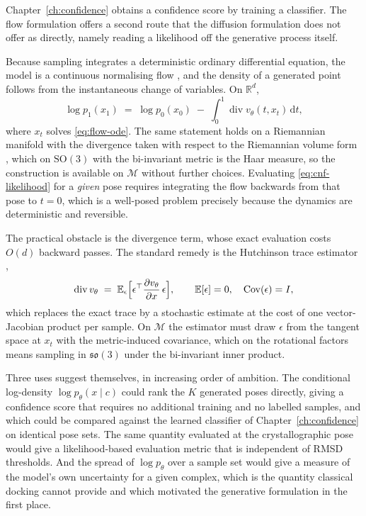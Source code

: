 \documentclass[11pt,a4paper]{report}
\theoremstyle{plain}
\theoremstyle{definition}
\theoremstyle{remark}
\newcommand{\R}{\mathbb{R}}
\newcommand{\SOthree}{\mathrm{SO}(3)}
\newcommand{\sothree}{\mathfrak{so}(3)}
\newcommand{\Mfd}{\mathcal{M}}
\newcommand{\E}{\mathbb{E}}
\newcommand{\dif}{\mathrm{d}}
\newcommand{\pred}{v_\theta}
\newcommand{\ctx}{c}
\newcommand{\divg}{\operatorname{div}}
\begin{document}
Chapter~\ref{ch:confidence} obtains a confidence score by training a
classifier. The flow formulation offers a second route that the diffusion
formulation does not offer as directly, namely reading a likelihood off the
generative process itself.

Because sampling integrates a deterministic ordinary differential equation, the
model is a continuous normalising flow \citep{chen2018neural}, and the density
of a generated point follows from the instantaneous change of variables. On
$\R^{d}$,
\begin{equation}
  \log p_1(x_1) \;=\; \log p_0(x_0)
    \;-\; \int_0^1 \divg \pred(t, x_t)\, \dif t ,
  \label{eq:cnf-likelihood}
\end{equation}
where $x_t$ solves \eqref{eq:flow-ode}. The same statement holds on a
Riemannian manifold with the divergence taken with respect to the Riemannian
volume form \citep{chen2024riemannian}, which on $\SOthree$ with the
bi-invariant metric is the Haar measure, so the construction is available on
$\Mfd$ without further choices. Evaluating \eqref{eq:cnf-likelihood} for a
\emph{given} pose requires integrating the flow backwards from that pose to
$t=0$, which is a well-posed problem precisely because the dynamics are
deterministic and reversible.

The practical obstacle is the divergence term, whose exact evaluation costs
$O(d)$ backward passes. The standard remedy is the Hutchinson trace estimator
\citep{hutchinson1989stochastic,grathwohl2019ffjord},
\begin{equation}
  \divg \pred \;=\; \E_{\epsilon}\Bigl[\epsilon^{\top}
    \frac{\partial \pred}{\partial x}\, \epsilon\Bigr],
  \qquad \E[\epsilon] = 0, \quad \operatorname{Cov}(\epsilon) = I,
  \label{eq:hutchinson}
\end{equation}
which replaces the exact trace by a stochastic estimate at the cost of one
vector-Jacobian product per sample. On $\Mfd$ the estimator must draw
$\epsilon$ from the tangent space at $x_t$ with the metric-induced covariance,
which on the rotational factors means sampling in $\sothree$ under the
bi-invariant inner product.

Three uses suggest themselves, in increasing order of ambition. The conditional
log-density $\log p_\theta(x\mid\ctx)$ could rank the $K$ generated poses
directly, giving a confidence score that requires no additional training and no
labelled samples, and which could be compared against the learned classifier of
Chapter~\ref{ch:confidence} on identical pose sets. The same quantity evaluated
at the crystallographic pose would give a likelihood-based evaluation metric
that is independent of RMSD thresholds. And the spread of $\log p_\theta$ over a
sample set would give a measure of the model's own uncertainty for a given
complex, which is the quantity classical docking cannot provide and which
motivated the generative formulation in the first place.
\end{document}
